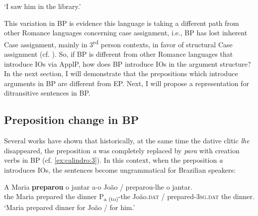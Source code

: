 \documentclass[output=paper,colorlinks,citecolor=brown,modfonts,nonflat]{langsci/langscibook}
\begin{document}
\ea%
    \label{ex:calindro:10}
    \glt ‘I saw him in the library.’\hfill \citep[94]{CarvalhoCalindro2018}
    \z
\z

This variation in BP is evidence this language is taking a different path from other Romance languages concerning case assignment, i.e., BP has lost inherent Case assignment, mainly in 3\textsuperscript{rd} person contexts, in favor of structural Case assignment (cf. \citealt{Calindro2015, CarvalhoCalindro2018}). So, if BP is different from other Romance languages that introduce IOs via ApplP, how does BP introduce IOs in the argument structure? In the next section, I will demonstrate that the prepositions which introduce arguments in BP are different from EP. Next, I will propose a representation for ditransitive sentences in BP.

\subsection{Preposition change in BP}\label{sec:calindro:2.2}

Several works have shown that historically, at the same time the dative clitic \textit{lhe} disappeared, the preposition \textit{a} was completely replaced by \textit{para} with creation verbs in BP (cf. \ref{ex:calindro:3}). In this context, when the preposition \textit{a} introduces IOs, the sentences become ungrammatical for Brazilian speakers:

\ea%
    {\label{ex:calindro:11}
    \gll A   Maria \textbf{preparou} o jantar     a-o {João} / preparou-lhe o jantar.   \\
    the Maria prepared  the dinner  P{\textsubscript{a (to)}}-the João.\textsc{dat} / prepared-\textsc{3sg.dat} the dinner. \\}
    \glt `Maria prepared dinner for João / for him.'
    \z
\end{document}
